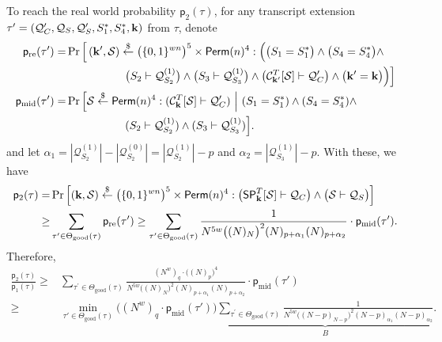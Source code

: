 To reach the real world probability $\mathsf{p}_2(\tau)$, for any transcript extension $\tau'=(\mathcal{Q}_{C}',\mathcal{Q}_{S},\mathcal{Q}_{S}',S_1^*,S_4^*,\mathbf{k})$ from $\tau$, denote            {\small
%
%
\begin{align}
\mathsf{p}_{\mathrm{re}}(\tau') = & \operatorname{Pr}\Big[\left(\mathbf{k}',\mathcal{S}\right) \stackrel{\$}{\leftarrow} \big(\{0,1\}^{wn}\big)^5 \times \mathsf{Perm}(n)^4:
\Big(\big(S_1=S_1^*\big)\wedge\big(S_4=S_4^*\big)\wedge		\notag 	\\
&\ \ \ \ \ \ \ \ \ \ \ \ \ \ \ \ \big(S_2\vdash\mathcal{Q}_{S_2}^{(1)}\big)\wedge\big(S_3\vdash\mathcal{Q}_{S_3}^{(1)}\big)\wedge\big(\mathcal{C}_{\mathbf{k}'}^T[\mathcal{S}] \vdash \mathcal{Q}_C'\big)\wedge\big(\mathbf{k}'=\mathbf{k}\big)\Big)\Big]\\
\mathsf{p}_{\mathrm{mid}}(\tau') = & \operatorname{Pr}\Big[\mathcal{S} \stackrel{\$}{\leftarrow}\mathsf{Perm}(n)^4:(\mathcal{C}_{\mathbf{k}}^T[\mathcal{S}] \vdash \mathcal{Q}_C')~\Big|~
(S_1=S_1^*)\wedge (S_4=S_4^*)\wedge	 	\notag 	\\
&\ \ \ \ \ \ \ \ \ \ \ \ \ \ \ \  (S_2\vdash\mathcal{Q}_{S_2}^{(1)})\wedge (S_3\vdash\mathcal{Q}_{S_3}^{(1)})\Big].
\end{align}
}%
%
%
and let $\alpha_1=|\mathcal{Q}_{S_2}^{(1)}|-|\mathcal{Q}_{S_2}^{(0)}|=|\mathcal{Q}_{S_2}^{(1)}|-p$ and $\alpha_2=|\mathcal{Q}_{S_3}^{(1)}|-p$. With these, we have
%
%
\begin{align*}
\mathsf{p}_2(\tau)=&\operatorname{Pr}\left[\left(\mathbf{k},\mathcal{S}\right) \stackrel{\$}{\leftarrow} \big(\{0,1\}^{wn}\big)^5 \times \mathsf{Perm}(n)^4:\big(\spn_{\bfk}^{T}[\mathcal{S}] \vdash \mathcal{Q}_{C}\big) \wedge \big(\mathcal{S} \vdash \mathcal{Q}_{S}\big)\right]		\\
\geq & \sum_{\tau^{\prime} \in \Theta_{\mathrm{good}}(\tau)} \mathsf{p}_{\mathrm{re}}(\tau')  
\geq
\sum_{\tau^{\prime} \in \Theta_{\mathrm{good}}(\tau)}
%
\frac{1}{N^{5w}\big((N)_{N}\big)^2(N)_{p+\alpha_1}(N)_{p+\alpha_2}}\cdot \mathsf{p}_{\mathrm{mid}}(\tau')  .
\end{align*}
%
%
Therefore,
%
%
\begin{align*}
\frac{\mathsf{p}_{2}(\tau)}{\mathsf{p}_{1}(\tau)}   \geq  &
\sum_{\tau^{\prime} \in \Theta_{\mathrm{good}}(\tau)}
\frac{(N^w)_q\cdot\big((N)_p\big)^4}{N^{5w}\big((N)_{N}\big)^2(N)_{p+\alpha_1}(N)_{p+\alpha_2}}\cdot \mathsf{p}_{\mathrm{mid}}(\tau')         \\
\geq  &    \min_{\tau' \in \Theta_{\mathrm{good}}(\tau)}\big((N^w)_q\cdot\mathsf{p}_{\mathrm{mid}}(\tau')\big)
\underbrace{\sum_{\tau^{\prime} \in \Theta_{\mathrm{good}}(\tau)}
\frac{1}{N^{5w}\big((N-p)_{N-p}\big)^2(N-p)_{\alpha_1}(N-p)_{\alpha_2}}}_{B} .
\end{align*}



